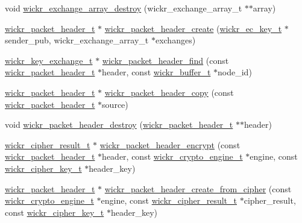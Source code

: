 \begin{DoxyCompactItemize}
\item 
void \mbox{\hyperlink{group__wickr__protocol_gadc1e5f5836bc09c1d6b8d6203d02a0eb}{wickr\+\_\+exchange\+\_\+array\+\_\+destroy}} (wickr\+\_\+exchange\+\_\+array\+\_\+t $\ast$$\ast$array)
\item 
\mbox{\hyperlink{structwickr__packet__header}{wickr\+\_\+packet\+\_\+header\+\_\+t}} $\ast$ \mbox{\hyperlink{group__wickr__protocol_ga8ad519d1b5dc3960c426db9a556404e1}{wickr\+\_\+packet\+\_\+header\+\_\+create}} (\mbox{\hyperlink{structwickr__ec__key}{wickr\+\_\+ec\+\_\+key\+\_\+t}} $\ast$sender\+\_\+pub, wickr\+\_\+exchange\+\_\+array\+\_\+t $\ast$exchanges)
\item 
\mbox{\hyperlink{structwickr__key__exchange}{wickr\+\_\+key\+\_\+exchange\+\_\+t}} $\ast$ \mbox{\hyperlink{group__wickr__protocol_gac9fab2b713e40a607735bcce0befee96}{wickr\+\_\+packet\+\_\+header\+\_\+find}} (const \mbox{\hyperlink{structwickr__packet__header}{wickr\+\_\+packet\+\_\+header\+\_\+t}} $\ast$header, const \mbox{\hyperlink{structwickr__buffer}{wickr\+\_\+buffer\+\_\+t}} $\ast$node\+\_\+id)
\item 
\mbox{\hyperlink{structwickr__packet__header}{wickr\+\_\+packet\+\_\+header\+\_\+t}} $\ast$ \mbox{\hyperlink{group__wickr__protocol_ga5ffb8763c9ebf2ad7322d507d117d7ba}{wickr\+\_\+packet\+\_\+header\+\_\+copy}} (const \mbox{\hyperlink{structwickr__packet__header}{wickr\+\_\+packet\+\_\+header\+\_\+t}} $\ast$source)
\item 
void \mbox{\hyperlink{group__wickr__protocol_gacb41cb9ad58871f01d8660e3ab115f4e}{wickr\+\_\+packet\+\_\+header\+\_\+destroy}} (\mbox{\hyperlink{structwickr__packet__header}{wickr\+\_\+packet\+\_\+header\+\_\+t}} $\ast$$\ast$header)
\item 
\mbox{\hyperlink{structwickr__cipher__result}{wickr\+\_\+cipher\+\_\+result\+\_\+t}} $\ast$ \mbox{\hyperlink{group__wickr__protocol_ga3495440a494c33a38ce4154b400e9809}{wickr\+\_\+packet\+\_\+header\+\_\+encrypt}} (const \mbox{\hyperlink{structwickr__packet__header}{wickr\+\_\+packet\+\_\+header\+\_\+t}} $\ast$header, const \mbox{\hyperlink{structwickr__crypto__engine}{wickr\+\_\+crypto\+\_\+engine\+\_\+t}} $\ast$engine, const \mbox{\hyperlink{structwickr__cipher__key}{wickr\+\_\+cipher\+\_\+key\+\_\+t}} $\ast$header\+\_\+key)
\item 
\mbox{\hyperlink{structwickr__packet__header}{wickr\+\_\+packet\+\_\+header\+\_\+t}} $\ast$ \mbox{\hyperlink{group__wickr__protocol_ga53ff33471ac0c4c7e3feedfcce520639}{wickr\+\_\+packet\+\_\+header\+\_\+create\+\_\+from\+\_\+cipher}} (const \mbox{\hyperlink{structwickr__crypto__engine}{wickr\+\_\+crypto\+\_\+engine\+\_\+t}} $\ast$engine, const \mbox{\hyperlink{structwickr__cipher__result}{wickr\+\_\+cipher\+\_\+result\+\_\+t}} $\ast$cipher\+\_\+result, const \mbox{\hyperlink{structwickr__cipher__key}{wickr\+\_\+cipher\+\_\+key\+\_\+t}} $\ast$header\+\_\+key)

\end{DoxyCompactItemize}
